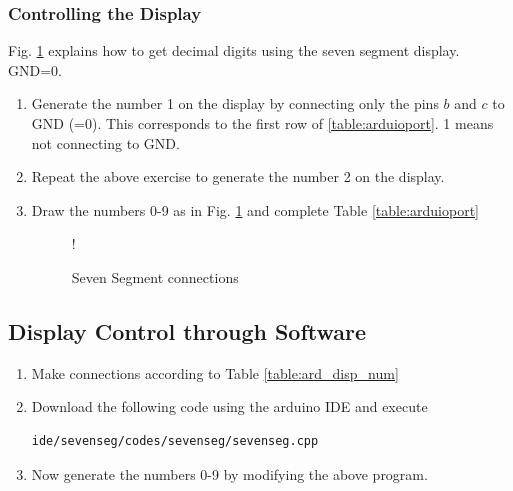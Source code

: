 \subsubsection{Controlling the Display}
Fig. \ref{fig:sevenseg12} explains how to get decimal digits using the seven segment display. GND=0.  
\begin{enumerate}[label=\arabic*.,ref=\theenumi]
\item	Generate the number 1 on the display by connecting only the pins $b$ and $c$ to GND (=0). This corresponds to the  first row of \ref{table:arduioport}. 1 means not connecting to GND.
	
\item
	Repeat the above exercise to generate the number 2 on the display.
	
%
\item
Draw the numbers 0-9 as in Fig. \ref{fig:sevenseg12} and complete Table \ref{table:arduioport}
	
\begin{table}[!ht]
\centering

\caption{}
\label{table:arduioport}
\end{table}
%
%
\begin{figure}[!ht]
\begin{center}
 {!} {

}
\end{center}
\caption{Seven Segment connections}
\label{fig:sevenseg12}
\end{figure}
%
\end{enumerate}
\subsection{Display Control through Software}
\begin{enumerate}[label=\arabic*.,ref=\theenumi]
\item
Make connections according to Table \ref{table:ard_disp_num}
\begin{table}
\centering

\caption{}
\label{table:ard_disp_num}
\end{table}

\item
Download the following code using the arduino IDE and execute
%
\begin{lstlisting}
ide/sevenseg/codes/sevenseg/sevenseg.cpp
\end{lstlisting}
%
\item
Now generate the numbers 0-9 by modifying the above program.

\end{enumerate}



